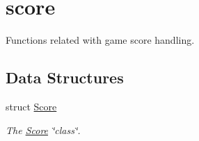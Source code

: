 \hypertarget{group__score}{}\section{score}
\label{group__score}


Functions related with game score handling.  


\subsection*{Data Structures}
\begin{DoxyCompactItemize}
\item 
struct \hyperlink{struct_score}{Score}
\begin{DoxyCompactList}\small\item\em The \hyperlink{struct_score}{Score} \char`\"{}class\char`\"{}. \end{DoxyCompactList}\end{DoxyCompactItemize}
